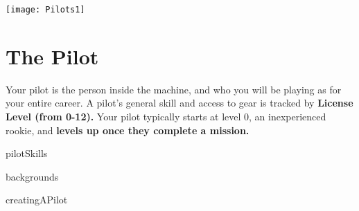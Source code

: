 \newpage
\begin{center}
    \texttt{[image: Pilots1]}
\end{center}

\chapter{The Pilot}

Your pilot is the person inside the machine, and who you will be playing as for your entire career.
A pilot’s general skill and access to gear is tracked by \textbf{License Level (from 0-12).} Your pilot
typically starts at level 0, an inexperienced rookie, and \textbf{levels up once they complete a mission.} 

{pilotSkills}

{backgrounds}

{creatingAPilot}